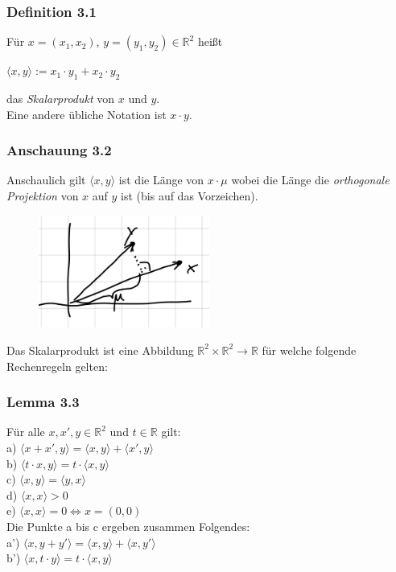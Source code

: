 \documentclass{article}
\begin{document}
\subsubsection*{Definition 3.1}
Für $x=(x_1, x_2)$, $y=(y_1, y_2) \in \mathbb{R}^2$ heißt \\
\begin{center}
    $\langle x,y \rangle := x_1 \cdot y_1 + x_2 \cdot y_2$
\end{center}
das \textit{Skalarprodukt} von $x$ und $y$. \\
Eine andere übliche Notation ist $x \cdot y$. \\

\subsubsection*{Anschauung 3.2}
Anschaulich gilt $\langle x,y \rangle$ ist die Länge von $x \cdot \mu$ wobei die Länge die \textit{orthogonale Projektion} von $x$ auf $y$ ist (bis auf das Vorzeichen). \\

\begin{figure}[h]
    \centering
    \includegraphics[width=0.5\textwidth]{Images/3.2.jpeg}
\end{figure}

Das Skalarprodukt ist eine Abbildung $\mathbb{R}^2 \times \mathbb{R}^2 \rightarrow \mathbb{R}$ für welche folgende Rechenregeln gelten: \\
\subsubsection*{Lemma 3.3}
Für alle $x, x', y \in \mathbb{R}^2$ und $t \in \mathbb{R}$ gilt: \\
a) $\langle x + x', y \rangle = \langle x,y \rangle + \langle x',y \rangle$ \\
b) $\langle t \cdot x, y \rangle = t \cdot \langle x,y \rangle$ \\
c) $\langle x,y \rangle = \langle y,x \rangle$ \\
d) $\langle x,x \rangle > 0$ \\
e) $\langle x,x \rangle = 0 \Leftrightarrow x = (0,0)$ \\
Die Punkte a bis c ergeben zusammen Folgendes: \\
a') $\langle x, y+y' \rangle = \langle x,y \rangle + \langle x,y' \rangle$ \\
b') $\langle x, t \cdot y \rangle = t \cdot \langle x,y \rangle$ \\
\\
\end{document}
